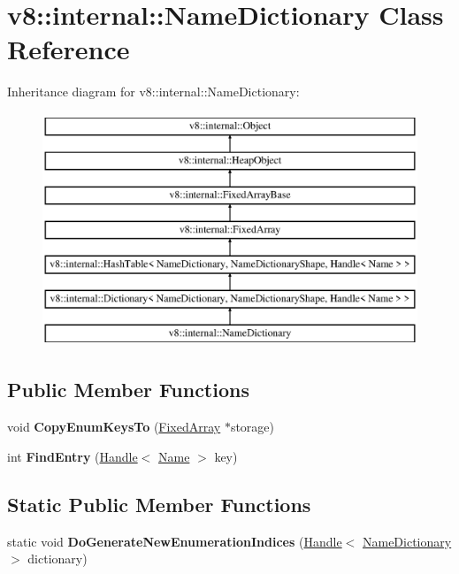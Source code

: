 \hypertarget{classv8_1_1internal_1_1_name_dictionary}{}\section{v8\+:\+:internal\+:\+:Name\+Dictionary Class Reference}
\label{classv8_1_1internal_1_1_name_dictionary}
Inheritance diagram for v8\+:\+:internal\+:\+:Name\+Dictionary\+:\begin{figure}[H]
\begin{center}
\leavevmode
\includegraphics[height=7.000000cm]{classv8_1_1internal_1_1_name_dictionary}
\end{center}
\end{figure}
\subsection*{Public Member Functions}
\begin{DoxyCompactItemize}
\item 
\hypertarget{classv8_1_1internal_1_1_name_dictionary_a8130d51544d75f499a2913ac63999a7f}{}void {\bfseries Copy\+Enum\+Keys\+To} (\hyperlink{classv8_1_1internal_1_1_fixed_array}{Fixed\+Array} $\ast$storage)\label{classv8_1_1internal_1_1_name_dictionary_a8130d51544d75f499a2913ac63999a7f}

\item 
\hypertarget{classv8_1_1internal_1_1_name_dictionary_a4f730749a3404a0b41b0cf6a83c339c9}{}int {\bfseries Find\+Entry} (\hyperlink{classv8_1_1internal_1_1_handle}{Handle}$<$ \hyperlink{classv8_1_1internal_1_1_name}{Name} $>$ key)\label{classv8_1_1internal_1_1_name_dictionary_a4f730749a3404a0b41b0cf6a83c339c9}

\end{DoxyCompactItemize}
\subsection*{Static Public Member Functions}
\begin{DoxyCompactItemize}
\item 
\hypertarget{classv8_1_1internal_1_1_name_dictionary_a1fdf2bce95aa10e0d435d734ea6f6868}{}static void {\bfseries Do\+Generate\+New\+Enumeration\+Indices} (\hyperlink{classv8_1_1internal_1_1_handle}{Handle}$<$ \hyperlink{classv8_1_1internal_1_1_name_dictionary}{Name\+Dictionary} $>$ dictionary)\label{classv8_1_1internal_1_1_name_dictionary_a1fdf2bce95aa10e0d435d734ea6f6868}

\end{DoxyCompactItemize}
